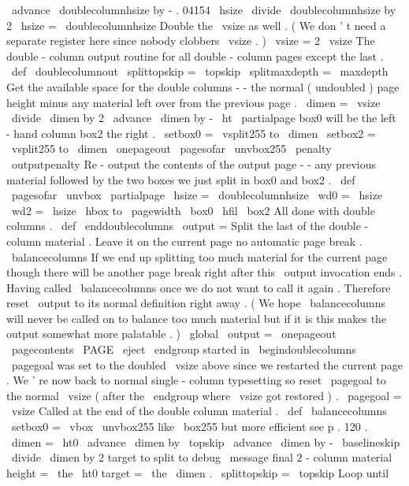 {{\
advance
\
doublecolumnhsize
by
-
.
04154
\
hsize
\
divide
\
doublecolumnhsize
by
2
\
hsize
=
\
doublecolumnhsize
%
%
Double
the
\
vsize
as
well
.
(
We
don
'
t
need
a
separate
register
here
%
since
nobody
clobbers
\
vsize
.
)
\
vsize
=
2
\
vsize
}
%
The
double
-
column
output
routine
for
all
double
-
column
pages
except
%
the
last
.
%
\
def
\
doublecolumnout
{
%
\
splittopskip
=
\
topskip
\
splitmaxdepth
=
\
maxdepth
%
Get
the
available
space
for
the
double
columns
-
-
the
normal
%
(
undoubled
)
page
height
minus
any
material
left
over
from
the
%
previous
page
.
\
dimen
=
\
vsize
\
divide
\
dimen
by
2
\
advance
\
dimen
by
-
\
ht
\
partialpage
%
%
box0
will
be
the
left
-
hand
column
box2
the
right
.
\
setbox0
=
\
vsplit255
to
\
dimen
\
setbox2
=
\
vsplit255
to
\
dimen
\
onepageout
\
pagesofar
\
unvbox255
\
penalty
\
outputpenalty
}
%
%
Re
-
output
the
contents
of
the
output
page
-
-
any
previous
material
%
followed
by
the
two
boxes
we
just
split
in
box0
and
box2
.
\
def
\
pagesofar
{
%
\
unvbox
\
partialpage
%
\
hsize
=
\
doublecolumnhsize
\
wd0
=
\
hsize
\
wd2
=
\
hsize
\
hbox
to
\
pagewidth
{
\
box0
\
hfil
\
box2
}
%
}
%
%
All
done
with
double
columns
.
\
def
\
enddoublecolumns
{
%
\
output
=
{
%
%
Split
the
last
of
the
double
-
column
material
.
Leave
it
on
the
%
current
page
no
automatic
page
break
.
\
balancecolumns
%
%
If
we
end
up
splitting
too
much
material
for
the
current
page
%
though
there
will
be
another
page
break
right
after
this
\
output
%
invocation
ends
.
Having
called
\
balancecolumns
once
we
do
not
%
want
to
call
it
again
.
Therefore
reset
\
output
to
its
normal
%
definition
right
away
.
(
We
hope
\
balancecolumns
will
never
be
%
called
on
to
balance
too
much
material
but
if
it
is
this
makes
%
the
output
somewhat
more
palatable
.
)
\
global
\
output
=
{
\
onepageout
{
\
pagecontents
\
PAGE
}
}
%
}
%
\
eject
\
endgroup
%
started
in
\
begindoublecolumns
%
%
\
pagegoal
was
set
to
the
doubled
\
vsize
above
since
we
restarted
%
the
current
page
.
We
'
re
now
back
to
normal
single
-
column
%
typesetting
so
reset
\
pagegoal
to
the
normal
\
vsize
(
after
the
%
\
endgroup
where
\
vsize
got
restored
)
.
\
pagegoal
=
\
vsize
}
%
%
Called
at
the
end
of
the
double
column
material
.
\
def
\
balancecolumns
{
%
\
setbox0
=
\
vbox
{
\
unvbox255
}
%
like
\
box255
but
more
efficient
see
p
.
120
.
\
dimen
=
\
ht0
\
advance
\
dimen
by
\
topskip
\
advance
\
dimen
by
-
\
baselineskip
\
divide
\
dimen
by
2
%
target
to
split
to
%
debug
\
message
{
final
2
-
column
material
height
=
\
the
\
ht0
target
=
\
the
\
dimen
.
}
%
\
splittopskip
=
\
topskip
%
Loop
until
}}
